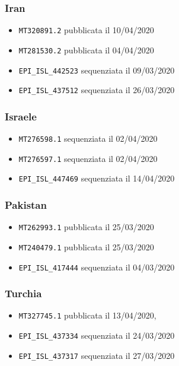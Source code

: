 \documentclass[11pt,italian]{article}
\begin{document}
\subsubsection*{Iran}
\begin{itemize}
    \item \lstinline{MT320891.2} pubblicata il 10/04/2020
    \item \lstinline{MT281530.2} pubblicata il 04/04/2020
    \item \lstinline{EPI_ISL_442523} sequenziata il 09/03/2020
    \item \lstinline{EPI_ISL_437512} sequenziata il 26/03/2020
\end{itemize}

\subsubsection*{Israele}
\begin{itemize}
    \item \lstinline{MT276598.1} sequenziata il 02/04/2020
    \item \lstinline{MT276597.1} sequenziata il 02/04/2020
    \item \lstinline{EPI_ISL_447469} sequenziata il 14/04/2020
\end{itemize}

\subsubsection*{Pakistan}
\begin{itemize}
    \item \lstinline{MT262993.1} pubblicata il 25/03/2020
    \item \lstinline{MT240479.1} pubblicata il 25/03/2020
    \item \lstinline{EPI_ISL_417444} sequenziata il 04/03/2020
\end{itemize}

\subsubsection*{Turchia}
\begin{itemize}
    \item \lstinline{MT327745.1} pubblicata il 13/04/2020,
    \item \lstinline{EPI_ISL_437334} sequenziata il 24/03/2020
    \item \lstinline{EPI_ISL_437317} sequenziata il 27/03/2020
\end{itemize}
\end{document}
